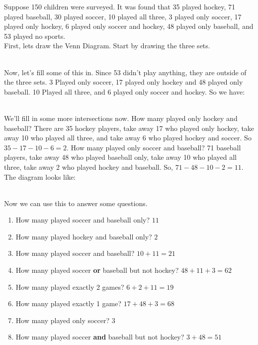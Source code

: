 \myexample
{
	Suppose 150 children were surveyed. It was found that 35 played hockey, 71 played baseball, 30 played soccer, 10 played all three, 3 played only soccer, 17 played only hockey, 6 played only soccer and hockey, 48 played only baseball, and 53 played no sports.\\
	First, lets draw the Venn Diagram. Start by drawing the three sets.\\
	\begin{venndiagram3sets}[shade=skyblue,labelA={H},labelB={B},labelC={S},labelNotABC={$\mathcal{U}$}]
	\end{venndiagram3sets}\\
	Now, let's fill some of this in. Since 53 didn't play anything, they are outside of the three sets. 3 Played only soccer, 17 played only hockey and 48 played only baseball. 10 Played all three, and 6 played only soccer and hockey. So we have:\\
	\begin{venndiagram3sets}[shade=skyblue,labelA={H},labelB={B},labelC={S},labelNotABC={\quad $\mathcal{U} \quad 53$},labelOnlyA={17},labelOnlyB={48},labelOnlyC={3},labelABC={10},labelOnlyAC={6}]
	\end{venndiagram3sets}\\
	We'll fill in some more intersections now. How many played only hockey and baseball? There are 35 hockey players, take away 17 who played only hockey, take away 10 who played all three, and take away 6 who played hockey and soccer. So $35-17-10-6=2$. How many played only soccer and baseball? 71 baseball players, take away 48 who played baseball only, take away 10 who played all three, take away 2 who played hockey and baseball. So, $71-48-10-2=11$. The diagram looks like:\\
	\begin{venndiagram3sets}[shade=skyblue,labelA={H},labelB={B},labelC={S},labelNotABC={\quad $\mathcal{U} \quad 53$},labelOnlyA={17},labelOnlyB={48},labelOnlyC={3},labelABC={10},labelOnlyAB={2},labelOnlyBC={11},labelOnlyAC={6}]
	\end{venndiagram3sets}\\
	Now we can use this to answer some questions.
	\begin{enumerate}
		\item How many played soccer and baseball only? $11$
		\item How many played hockey and baseball only? $2$
		\item How many played soccer and baseball? $10+11=21$
		\item How many played soccer {\bf or} baseball but not hockey? $48+11+3=62$
		\item How many played exactly 2 games? $6+2+11=19$
		\item How many played exactly 1 game? $17+48+3=68$
		\item How many played only soccer? $3$
		\item How many played soccer {\bf and} baseball but not hockey? $3+48=51$
	\end{enumerate}
}
